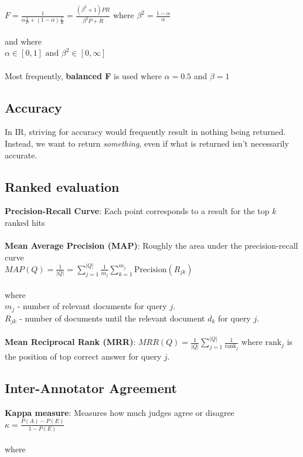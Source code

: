 \documentclass{article}%
\begin{document}
$F = \frac{1}{\alpha \frac{1}{P} + (1 - \alpha)\frac{1}{R}} = \frac{(\beta^2 + 1) PR}{\beta^2P + R}
\textrm{ where } \beta^2 = \frac{1 - \alpha}{\alpha}$ \\
\\
and where\\

$\alpha \in [0, 1] \textrm{ and } \beta^2 \in [0, \infty]$\\
\\
Most frequently, \textbf{balanced F} is used where $\alpha = 0.5$ and $\beta = 1$
\subsection*{Accuracy}
In IR, striving for accuracy would frequently result in nothing being returned. Instead, we want
to return \textit{something}, even if what is returned isn't necessarily accurate.
\subsection*{Ranked evaluation}
\textbf{Precision-Recall Curve}: Each point corresponds to a result for the top $k$ ranked hits\\
\\
\textbf{Mean Average Precision (MAP)}: Roughly the area under the precision-recall curve\\

$MAP(Q) = \frac{1}{|Q|} = \sum\limits_{j=1}^{|Q|}\frac{1}{m_j} \sum\limits_{k = 1}^{m_j} \textrm{Precision}(R_{jk})$\\
\\
where\\

$m_j$ - number of relevant documents for query $j$.\\

$R_{jk}$ - number of documents until the relevant document $d_k$ for query $j$.\\
\\
\textbf{Mean Reciprocal Rank (MRR)}: $MRR(Q) = \frac{1}{|Q|} \sum\limits_{j = 1}^{|Q|}\frac{1}{\textrm{rank}_j}$
where $\textrm{rank}_j$ is the position of top correct answer for query $j$.
\subsection*{Inter-Annotator Agreement}
\textbf{Kappa measure}: Measures how much judges agree or disagree\\

$\kappa = \frac{P(A) - P(E)}{1 - P(E)}$\\
\\
where\\
\end{document}
